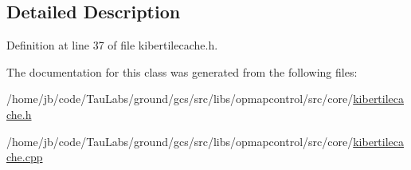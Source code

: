 \subsection{\-Detailed \-Description}


\-Definition at line 37 of file kibertilecache.\-h.



\-The documentation for this class was generated from the following files\-:\begin{DoxyCompactItemize}
\item 
/home/jb/code/\-Tau\-Labs/ground/gcs/src/libs/opmapcontrol/src/core/\hyperlink{kibertilecache_8h}{kibertilecache.\-h}\item 
/home/jb/code/\-Tau\-Labs/ground/gcs/src/libs/opmapcontrol/src/core/\hyperlink{kibertilecache_8cpp}{kibertilecache.\-cpp}\end{DoxyCompactItemize}
